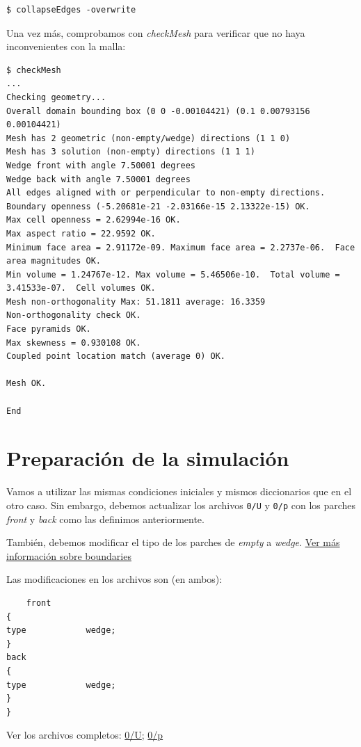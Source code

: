 \documentclass{article}
\begin{document}
\begin{lstlisting}
$ collapseEdges -overwrite
\end{lstlisting}

Una vez más, comprobamos con \textit{checkMesh} para verificar que no haya inconvenientes con la malla:

\begin{lstlisting}
$ checkMesh
...
Checking geometry...
Overall domain bounding box (0 0 -0.00104421) (0.1 0.00793156 0.00104421)
Mesh has 2 geometric (non-empty/wedge) directions (1 1 0)
Mesh has 3 solution (non-empty) directions (1 1 1)
Wedge front with angle 7.50001 degrees
Wedge back with angle 7.50001 degrees
All edges aligned with or perpendicular to non-empty directions.
Boundary openness (-5.20681e-21 -2.03166e-15 2.13322e-15) OK.
Max cell openness = 2.62994e-16 OK.
Max aspect ratio = 22.9592 OK.
Minimum face area = 2.91172e-09. Maximum face area = 2.2737e-06.  Face area magnitudes OK.
Min volume = 1.24767e-12. Max volume = 5.46506e-10.  Total volume = 3.41533e-07.  Cell volumes OK.
Mesh non-orthogonality Max: 51.1811 average: 16.3359
Non-orthogonality check OK.
Face pyramids OK.
Max skewness = 0.930108 OK.
Coupled point location match (average 0) OK.

Mesh OK.

End
\end{lstlisting}

\section{Preparación de la simulación}
Vamos a utilizar las mismas condiciones iniciales y mismos diccionarios que en el otro caso. Sin embargo, debemos actualizar los archivos \texttt{0/U} y \texttt{0/p} con los parches \textit{front} y \textit{back} como las definimos anteriormente.

También, debemos modificar el tipo de los parches de \textit{empty} a \textit{wedge}. \href{https://www.openfoam.com/documentation/user-guide/boundaries.php}{Ver más información sobre boundaries}

Las modificaciones en los archivos son (en ambos):
\begin{lstlisting}
    front
{
type            wedge;
}
back
{
type            wedge;
}
}
\end{lstlisting}

\noindent Ver los archivos completos: 
\href{https://github.com/guillerolle/casos_cfd/tree/master/02/0/U}{0/U};
\href{https://github.com/guillerolle/casos_cfd/tree/master/02/0/p}{0/p}
\end{document}
